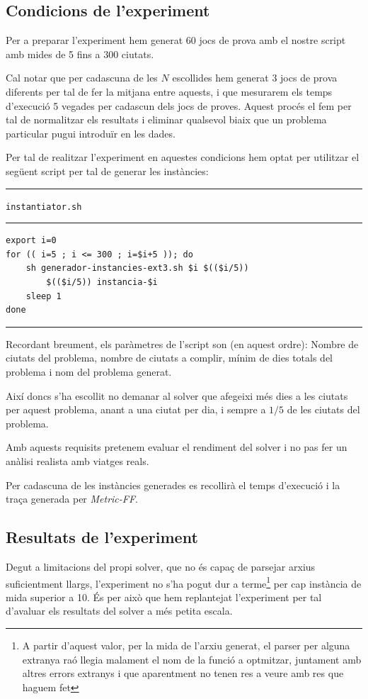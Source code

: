\documentclass[11pt,a4paper]{article}
\begin{document}
\subsection{Condicions de l'experiment}

Per a preparar l'experiment hem generat 60 jocs de prova amb el nostre script amb mides de 5 fins a 300 ciutats. 

Cal notar que per cadascuna de les $N$ escollides hem generat 3 jocs de prova diferents per tal de fer la mitjana entre aquests, i que mesurarem els temps d'execució 5 vegades per cadascun dels jocs de proves. Aquest procés el fem per tal de normalitzar els resultats i eliminar qualsevol biaix que un problema particular pugui introduïr en les dades.

Per tal de realitzar l'experiment en aquestes condicions hem optat per utilitzar el següent script per tal de generar les instàncies:

\begin{samepage}
\medskip
\noindent
\rule{0.1\textwidth}{0.5mm}
\texttt{instantiator.sh}
\rule{0.65\textwidth}{0.5mm}
\begin{verbatim}
export i=0
for (( i=5 ; i <= 300 ; i=$i+5 )); do
    sh generador-instancies-ext3.sh $i $(($i/5))
        $(($i/5)) instancia-$i
    sleep 1
done
\end{verbatim}
\rule{\textwidth}{0.5mm}
\end{samepage}

Recordant breument, els paràmetres de l'script son (en aquest ordre): Nombre de ciutats del problema, nombre de ciutats a complir, mínim de dies totals del problema i nom del problema generat.

Així doncs s'ha escollit no demanar al solver que afegeixi més dies a les ciutats per aquest problema, anant a una ciutat per dia, i sempre a $1/5$ de les ciutats del problema. 

Amb aquests requisits pretenem evaluar el rendiment del solver i no pas fer un anàlisi realista amb viatges reals.


Per cadascuna de les instàncies generades es recollirà el temps d'execució i la traça generada per \emph{Metric-FF}.


\subsection{Resultats de l'experiment}

Degut a limitacions del propi solver, que no és capaç de parsejar arxius suficientment llargs, l'experiment no s'ha pogut dur a terme\footnote{A partir d'aquest valor, per la mida de l'arxiu generat, el parser per alguna extranya raó llegia malament el nom de la funció a optmitzar, juntament amb altres errors extranys i que aparentment no tenen res a veure amb res que haguem fet} per cap instància de mida superior a 10. És per això que hem replantejat l'experiment per tal d'avaluar els resultats del solver a més petita escala. 
\end{document}
